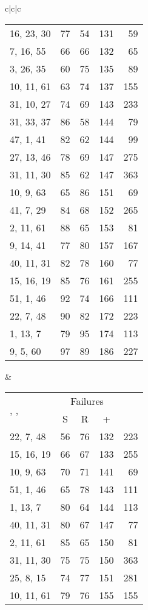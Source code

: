 \documentclass{acmsmalltr}
\newcommand{\xst}[3]{#1, #2, #3}
\begin{document}
\begin{sidewaystable}
{\begin{tabular}{c|c|c}
\begin{tabular}{l|rr|r|r}
\xst{16}{23}{30} & 77 & 54 & 131 & 59\\
\xst{7}{16}{55} & 66 & 66 & 132 & 65\\
\xst{3}{26}{35} & 60 & 75 & 135 & 89\\
\xst{10}{11}{61} & 63 & 74 & 137 & 155\\
\xst{31}{10}{27} & 74 & 69 & 143 & 233\\
\xst{31}{33}{37} & 86 & 58 & 144 & 79\\
\xst{47}{1}{41} & 82 & 62 & 144 & 99\\
\xst{27}{13}{46} & 78 & 69 & 147 & 275\\
\xst{31}{11}{30} & 85 & 62 & 147 & 363\\
\xst{10}{9}{63} & 65 & 86 & 151 & 69\\
\xst{41}{7}{29} & 84 & 68 & 152 & 265\\
\xst{2}{11}{61} & 88 & 65 & 153 & 81\\
\xst{9}{14}{41} & 77 & 80 & 157 & 167\\
\xst{40}{11}{31} & 82 & 78 & 160 & 77\\
\xst{15}{16}{19} & 85 & 76 & 161 & 255\\
\xst{51}{1}{46} & 92 & 74 & 166 & 111\\
\xst{22}{7}{48} & 90 & 82 & 172 & 223\\
\xst{1}{13}{7} & 79 & 95 & 174 & 113\\
\xst{9}{5}{60} & 97 & 89 & 186 & 227\\
\end{tabular}&
\begin{tabular}{l|rr|r|r}
\multirow{2}{*}{, , } & \multicolumn{3}{c|}{Failures}  & \multirow{2}{*}{}\\
& \multicolumn{1}{c}{S} & \multicolumn{1}{c|}{R} & \multicolumn{1}{c|}{+} \\
\hline
\xst{22}{7}{48} & 56 & 76 & 132 & 223\\
\xst{15}{16}{19} & 66 & 67 & 133 & 255\\
\xst{10}{9}{63} & 70 & 71 & 141 & 69\\
\xst{51}{1}{46} & 65 & 78 & 143 & 111\\
\xst{1}{13}{7} & 80 & 64 & 144 & 113\\
\xst{40}{11}{31} & 80 & 67 & 147 & 77\\
\xst{2}{11}{61} & 85 & 65 & 150 & 81\\
\xst{31}{11}{30} & 75 & 75 & 150 & 363\\
\xst{25}{8}{15} & 74 & 77 & 151 & 281\\
\xst{10}{11}{61} & 79 & 76 & 155 & 155\\

\end{tabular}
\end{tabular}}
\end{sidewaystable}
\end{document}
